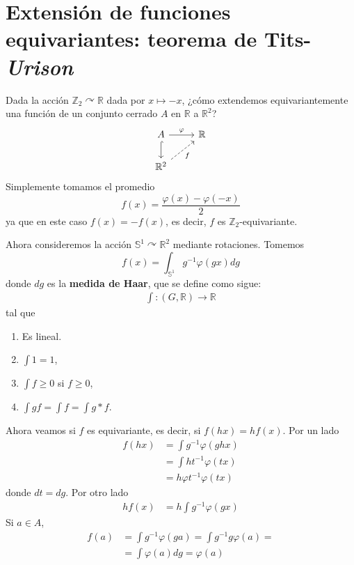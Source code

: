 \documentclass[spanish]{article}
\theoremstyle{definition}
\newcommand{\R}{\mathbb{R}}
\newcommand{\Z}{\mathbb{Z}}
\newcommand{\SP}{\mathbb{S}}
\begin{document}
\section{Extensión de funciones equivariantes: teorema de Tits-\textit{Urison}}
Dada la acción $\Z_2\curvearrowright\R$ dada por $x\mapsto -x$, ¿cómo extendemos equivariantemente una función de un conjunto cerrado $A$ en $\R$ a $\R^2$?
\[\begin{tikzcd}
	A\arrow[r,"\varphi"]\arrow[hook,d]&\R\\
	\R^2\arrow[ur,dashed,"f",swap]
\end{tikzcd}\]
Simplemente tomamos el promedio
\[f(x)=\frac{\varphi(x)-\varphi(-x)}{2}\]
ya que en este caso $f(x)=-f(x)$, es decir, $f$ es $\Z_2$-equivariante.

Ahora consideremos la acción $\SP^1\curvearrowright\R^2$ mediante rotaciones. Tomemos
\[f(x)=\int_{\SP^1}g^{-1}\varphi(gx)dg\]
donde $dg$ es la \textbf{medida de Haar}, que se define como sigue:
\begin{align*}
	\int:(G,\R)\to\R
\end{align*}
	tal que
	\begin{enumerate}
		\item Es lineal.
		\item $\int1=1$,
		\item $\int f\geq0$ si $f\geq0$,
		\item $\int gf=\int f=\int g*f$.
	\end{enumerate}
Ahora veamos si $f$ es equivariante, es decir, si $f(hx)=hf(x)$. Por un lado
\begin{align*}
	f(hx)&=\int g^{-1}\varphi(ghx)\\
	&=\int h t^{-1}\varphi(tx)\\
	&=h\varphi t^{-1}\varphi(tx)
\end{align*}
donde $dt=dg$. Por otro lado
\begin{align*}
	hf(x)&=h\int g^{-1}\varphi(gx)
\end{align*}
Si $a\in A$,
\begin{align*}
	f(a)&=\int g^{-1}\varphi(ga)=\int g^{-1}g\varphi(a)=\\
	&=\int\varphi(a)dg=\varphi(a)
\end{align*}
\end{document}
